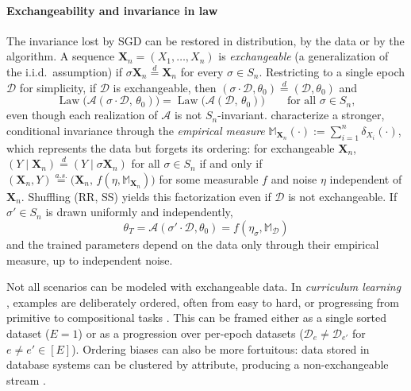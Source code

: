 \documentclass[mathematics,review,submit,moreauthors]{Definitions/mdpi}
\begin{document}
\paragraph{Exchangeability and invariance in law}\label{par:exchangeability}
The invariance lost by SGD can be restored in distribution, by the data or by the algorithm.
A sequence $\boldsymbol{X}_n=(X_1,\dots,X_n)$ is \emph{exchangeable} (a generalization of the i.i.d.\ assumption) if $\sigma\boldsymbol{X}_n \overset{d}{=} \boldsymbol{X}_n$ for every $\sigma\in S_n$.
Restricting to a single epoch $\mathcal{D}$ for simplicity, if $\mathcal{D}$ is exchangeable, then $(\sigma\cdot\mathcal{D},\theta_0)\overset{d}{=}(\mathcal{D},\theta_0)$ and
$$
\operatorname{Law}\big(\mathcal{A}(\sigma\cdot\mathcal{D},\,\theta_0)\big) = \operatorname{Law}\big(\mathcal{A}(\mathcal{D},\,\theta_0)\big) \qquad \text{for all } \sigma\in S_n,
$$
even though each realization of $\mathcal{A}$ is not $S_n$-invariant.
\citet{bloem-reddy2020} characterize a stronger, conditional invariance through the \emph{empirical measure} $\mathbb{M}_{\boldsymbol{X}_n}(\cdot):=\sum_{i=1}^{n}\delta_{X_i}(\cdot)$, which represents the data but forgets its ordering: for exchangeable $\boldsymbol{X}_n$, $(Y \mid \boldsymbol{X}_n)\overset{d}{=}(Y \mid \sigma\boldsymbol{X}_n)$ for all $\sigma\in S_n$ if and only if $(\boldsymbol{X}_n, Y)\overset{a.s.}{=}\big(\boldsymbol{X}_n,\, f(\eta, \mathbb{M}_{\boldsymbol{X}_n})\big)$ for some measurable $f$ and noise $\eta$ independent of $\boldsymbol{X}_n$.
Shuffling (RR, SS) yields this factorization even if $\mathcal{D}$ is not exchangeable.
If $\sigma'\in S_n$ is drawn uniformly and independently,
$$
\theta_T=\mathcal{A}(\sigma'\cdot\mathcal{D},\theta_0)=f(\eta_\sigma,\mathbb{M}_{\mathcal{D}})
$$
and the trained parameters depend on the data only through their empirical measure, up to independent noise.

\begin{Remark}
    Not all scenarios can be modeled with exchangeable data.
    In \emph{curriculum learning} \citep{bengio2009p2aicml}, examples are deliberately ordered, often from easy to hard, or progressing from primitive to compositional tasks \citep{lee2024}.
    This can be framed either as a single sorted dataset ($E=1$) or as a progression over per-epoch datasets ($\mathcal{D}_e\neq \mathcal{D}_{e'}$ for $e\neq e' \in [E]$).
    Ordering biases can also be more fortuitous: data stored in database systems can be clustered by attribute, producing a non-exchangeable stream \citep{xu2024vj}.
\end{Remark}
\end{document}
